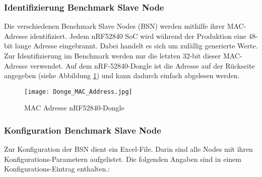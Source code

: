 \subsubsection{Identifizierung Benchmark Slave Node}\label{subsubsec:NodeIdentification}

Die verschiedenen Benchmark Slave Nodes (BSN) werden mithilfe ihrer MAC-Adresse identifiziert.
Jedem nRF52840 SoC wird während der Produktion eine 48-bit lange Adresse eingebrannt. Dabei handelt es sich um zufällig generierte Werte.
Zur Identifizierung im Benchmark werden nur die letzten 32-bit dieser MAC-Adresse verwendet.
Auf dem nRF-52840-Dongle ist die Adresse auf der Rückseite angegeben (siehe Abbildung \ref{fig:MACAdresseDongle}) und kann dadurch einfach abgelesen werden.

\begin{figure}[H]
	\centering
	\texttt{[image: Donge\_MAC\_Address.jpg]}
	\caption{MAC Adresse nRF52840-Dongle}\label{fig:MACAdresseDongle}
\end{figure}


\subsubsection{Konfiguration Benchmark Slave Node}\label{subsubsec:NodeConfiguration}
Zur Konfiguration der BSN dient ein Excel-File. Darin sind alle Nodes mit ihren Konfigurations-Parametern aufgelistet. Die folgenden Angaben sind in einem Konfigurations-Eintrag enthalten.:

